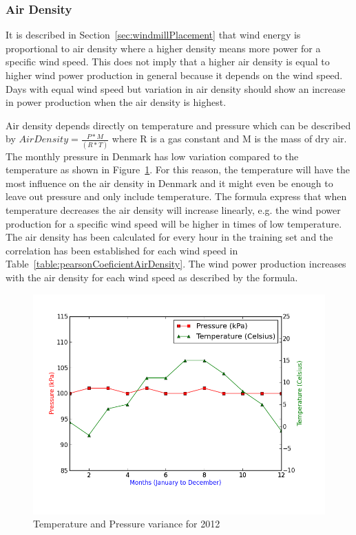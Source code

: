 \subsubsection{Air Density}
\label{sec:airDensity}
It is described in Section~\ref{sec:windmillPlacement} that wind energy is proportional to air density where a higher density means more power for a specific wind speed. This does not imply that a higher air density is equal to higher wind power production in general because it depends on the wind speed. Days with equal wind speed but variation in air density should show an increase in power production when the air density is highest. 

Air density depends directly on temperature and pressure which can be described by $Air Density=\frac{P*M}{(R*T)}$ where R is a gas constant and M is the mass of dry air. The monthly pressure in Denmark has low variation compared to the temperature as shown in Figure~\ref{fig:pressureTemperatureVariance}. For this reason, the temperature will have the most influence on the air density in Denmark and it might even be enough to leave out pressure and only include temperature. The formula express that when temperature decreases the air density will increase linearly, e.g. the wind power production for a specific wind speed will be higher in times of low temperature. The air density has been calculated for every hour in the training set and the correlation has been established for each wind speed in Table~\ref{table:pearsonCoeficientAirDensity}. The wind power production increases with the air density for each wind speed as described by the formula.

\begin{figure}[H]
\centering
\includegraphics[width=0.99\linewidth,natwidth=898,natheight=587]{billeder/pressureTemperatureVariance.png}
\caption{Temperature and Pressure variance for 2012}
\label{fig:pressureTemperatureVariance}
\end{figure}

